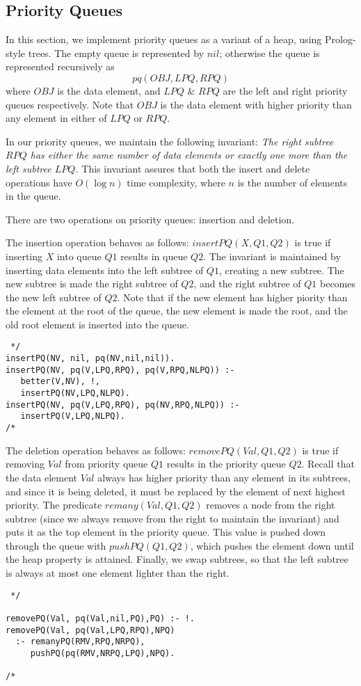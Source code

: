 \subsection{Priority Queues}

In this section, we implement priority queues as a variant of a heap,
using Prolog-style trees.  The empty queue is represented by $nil$; 
otherwise the queue is represented recursively as	
\[pq(OBJ,LPQ,RPQ)\]
where $OBJ$ is the data element, and $LPQ$ \& $RPQ$ are the left and
right priority queues respectively.  Note that $OBJ$ is the data
element with higher priority than any element in either of 
$LPQ$ or $RPQ$.  

In our priority queues, we maintain the following invariant: {\em The
right subtree $RPQ$ has either the same number of data elements or
exactly one more than the left subtree $LPQ$.}  This invariant assures
that both the insert and delete operations have $O(\log n)$ time
complexity, where $n$ is the number of elements in the queue.

There are two operations on priority queues: insertion and deletion.

The insertion operation behaves as follows: $insertPQ(X,Q1,Q2)$ is
true if inserting $X$ into queue $Q1$ results in queue $Q2$.  The
invariant is maintained by inserting data elements into the left 
subtree of $Q1$, creating a new subtree.  The new subtree is made 
the right subtree of $Q2$, and the right subtree of $Q1$ becomes 
the new left subtree of $Q2$.  Note that if the new element has 
higher piority than the element at the root of the queue, the new 
element is made the root, and the old root element is inserted into 
the queue.

\begin{verbatim} */
insertPQ(NV, nil, pq(NV,nil,nil)).
insertPQ(NV, pq(V,LPQ,RPQ), pq(V,RPQ,NLPQ)) :-
   better(V,NV), !,
   insertPQ(NV,LPQ,NLPQ).
insertPQ(NV, pq(V,LPQ,RPQ), pq(NV,RPQ,NLPQ)) :-
   insertPQ(V,LPQ,NLPQ).
/* \end{verbatim}

The deletion operation behaves as follows:  $removePQ(Val,Q1,Q2)$ is
true if removing $Val$ from priority queue $Q1$ results in the
priority queue $Q2$.  Recall that the data element $Val$ always has 
higher priority than any element in its subtrees, and since it is
being deleted, it must be replaced by the element of next highest
priority.  The predicate $remany(Val,Q1,Q2)$ removes a node from the
right subtree (since we always remove from the right to maintain the
invariant) and puts it as the top element in the priority queue.  This
value is pushed down through the queue with $pushPQ(Q1,Q2)$, which
pushes the element down until the heap property is attained.
Finally, we swap subtrees, so that the left subtree is always at most
one element lighter than the right.
\begin{verbatim} */

removePQ(Val, pq(Val,nil,PQ),PQ) :- !.
removePQ(Val, pq(Val,LPQ,RPQ),NPQ) 
  :- remanyPQ(RMV,RPQ,NRPQ),
     pushPQ(pq(RMV,NRPQ,LPQ),NPQ).

/*
\end{verbatim}

